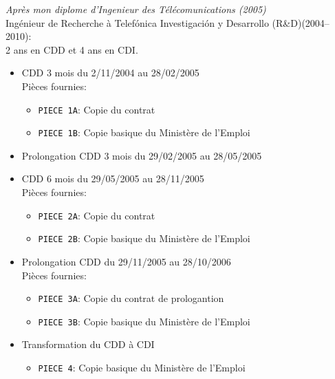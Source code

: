 \textit{Après mon diplome d'Ingenieur des Télécomunications (2005)}\\
Ingénieur de Recherche à Telefónica Investigación y Desarrollo (R\&D)(2004--2010):\\
2 ans en CDD et 4 ans en CDI.\\
\begin{itemize}
\item CDD 3 mois du 2/11/2004 au 28/02/2005\\
	Pièces fournies:
	\begin{itemize}
		\item \texttt{PIECE 1A}: Copie du contrat
		\item \texttt{PIECE 1B}:  Copie basique du Ministère de l'Emploi
	\end{itemize}
\item Prolongation CDD 3 mois du 29/02/2005 au 28/05/2005 \\
\item CDD 6 mois du 29/05/2005 au 28/11/2005\\
	Pièces fournies:
	\begin{itemize}
		\item \texttt{PIECE 2A}:  Copie du contrat
		\item \texttt{PIECE 2B}: Copie basique du Ministère de l'Emploi
	\end{itemize}
\item Prolongation CDD du 29/11/2005 au 28/10/2006\\
	Pièces fournies:
	\begin{itemize}
		\item \texttt{PIECE 3A}: Copie du contrat de prologantion\\
		\item \texttt{PIECE 3B}: Copie basique du Ministère de l'Emploi\\	
	\end{itemize}
\item Transformation du CDD à CDI \\
	\begin{itemize}
		\item \texttt{PIECE 4}: Copie basique du Ministère de l'Emploi
	\end{itemize}
\end{itemize}

